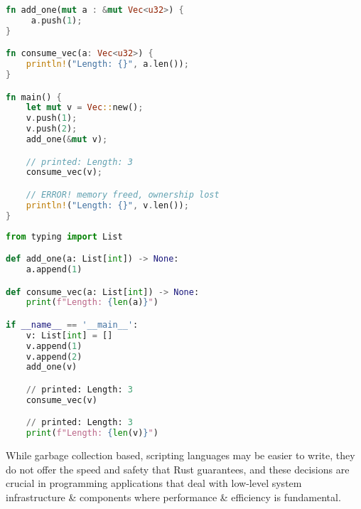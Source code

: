 \documentclass[10pt,a4paper,twocolumn]{article}
\begin{document}
\begin{lstlisting}[language=Rust,caption={Ownership tracking in Rust}]
fn add_one(mut a : &mut Vec<u32>) {
     a.push(1);
}

fn consume_vec(a: Vec<u32>) {
    println!("Length: {}", a.len());
}

fn main() {
    let mut v = Vec::new();
    v.push(1);
    v.push(2);
    add_one(&mut v);

    // printed: Length: 3
    consume_vec(v);

    // ERROR! memory freed, ownership lost
    println!("Length: {}", v.len());
}
\end{lstlisting}

\begin{lstlisting}[language=Python,caption={Garbage collection in Python}]
from typing import List

def add_one(a: List[int]) -> None:
    a.append(1)

def consume_vec(a: List[int]) -> None:
    print(f"Length: {len(a)}")

if __name__ == '__main__':
    v: List[int] = []
    v.append(1)
    v.append(2)
    add_one(v)

    // printed: Length: 3
    consume_vec(v)

    // printed: Length: 3
    print(f"Length: {len(v)}")
\end{lstlisting}

While garbage collection based, scripting languages may be easier to write, they do not offer the speed and safety that Rust guarantees, and these decisions are crucial in programming applications that deal with low-level system infrastructure \& components where performance \& efficiency is fundamental.



\end{document}
